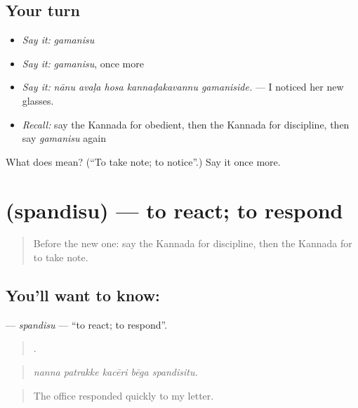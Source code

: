 \subsection*{Your turn}
\begin{itemize}
\raggedright
  \item \emph{Say it:} \emph{gamanisu}
  \item \emph{Say it:} \emph{gamanisu}, once more
  \item \emph{Say it:} \emph{nānu avaḷa hosa kannaḍakavannu gamaniside.} — I noticed her new glasses.
  \item \emph{Recall:} say the Kannada for obedient, then the Kannada for discipline, then say \emph{gamanisu} again
\end{itemize}

\begin{tcolorbox}[breakable,colback=teal!4,colframe=teal!35!black,title={Before you move on}]
What does  mean? (\textquotedblleft{}To take note; to notice\textquotedblright{}.) Say it once more.
\end{tcolorbox}
\section[\texorpdfstring{\kn{ಸ್ಪಂದಿಸು} (spandisu)}{ಸ್ಪಂದಿಸು (spandisu)}]{ (spandisu) — to react; to respond}

\label{lesson:KA-C502-spandisu}



\begin{quote}
Before the new one: say the Kannada for discipline, then the Kannada for to take note.
\end{quote}

\subsection*{You'll want to know: }
\textbf{} — \emph{spandisu} — \textquotedblleft{}to react; to respond\textquotedblright{}.

\begin{quote}
    .
\end{quote}

\begin{quote}
\emph{nanna patrakke kacēri bēga spandisitu.}
\end{quote}

\begin{quote}
The office responded quickly to my letter.
\end{quote}

